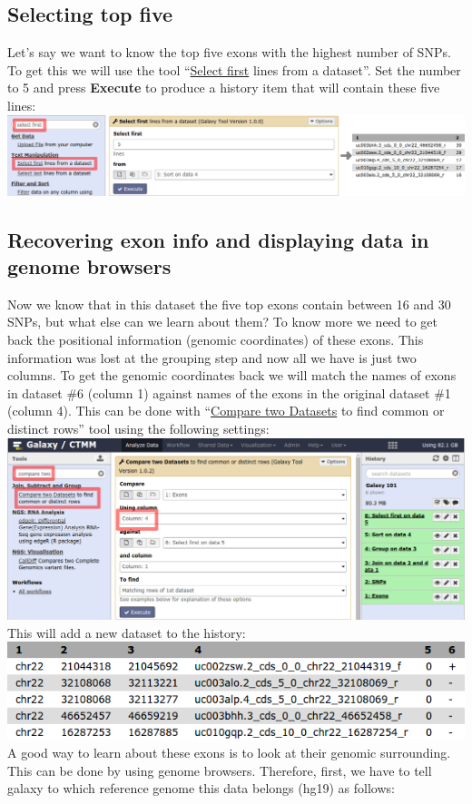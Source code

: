 \documentclass[11pt,a4paper]{article}
\begin{document}
\subsection{Selecting top five}
Let's say we want to know the top five exons with the highest number of SNPs. To get this we will use the tool ``\underline{Select first} lines from a dataset''. Set the number to 5 and press \textbf{Execute} to produce a history item that will contain these five lines:\\

\includegraphics[width=\textwidth]{figures/101_17}\\
\subsection{ Recovering exon info and displaying data in genome
browsers}
Now we know that in this dataset the five top exons contain between 16 and 30 SNPs, but what else can we learn about them? To know more we need to get back the positional information (genomic coordinates) of these exons. This information was lost at the grouping step and now all we have is just two columns. To get the genomic coordinates back we will match the names of exons in dataset \#6 (column 1) against names of the exons in the original dataset \#1 (column 4). This can be done with ``\underline{Compare two Datasets} to find common or distinct rows'' tool using the following settings:\\

\includegraphics[width=\textwidth]{figures/101_18}\\
This will add a new dataset to the history:\\

\includegraphics[scale=0.65]{figures/101_19}\\
A good way to learn about these exons is to look at their genomic surrounding. This can be done by using genome browsers. 
Therefore, first, we have to tell galaxy to which reference genome this data belongs (hg19) as follows:\\
\end{document}
